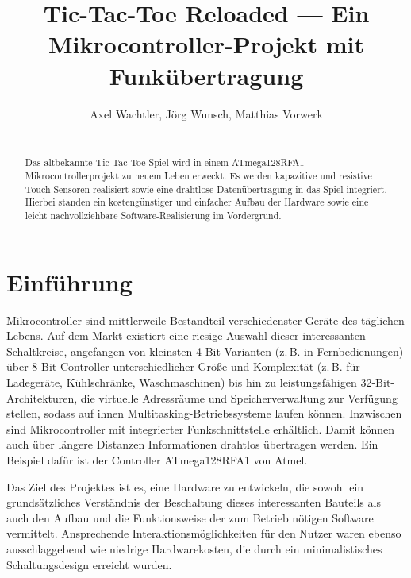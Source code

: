 \documentclass{clt2012}
\begin{document}
\title{Tic-\hspace{-0.2em}Tac-\hspace{-0.2em}Toe Reloaded --- Ein Mikrocontroller-Projekt mit Funkübertragung}
\author{Axel Wachtler, Jörg Wunsch, Matthias Vorwerk\\
\\
}
\maketitle

\begin{abstract}
Das altbekannte Tic-Tac-Toe-Spiel wird in einem \mbox{ATmega128RFA1}-Mikro\-con\-trol\-ler\-pro\-jekt zu neuem Leben erweckt.
Es werden kapazitive und resistive Touch-Sensoren realisiert sowie eine drahtlose Datenübertragung in das Spiel integriert.
Hierbei standen ein kostengünstiger und einfacher Aufbau der Hardware sowie eine leicht nachvollziehbare Software-Realisierung im Vordergrund.
\end{abstract}

\setlength{\parskip}{1ex}

\section{Einführung}
Mikrocontroller sind mittlerweile Bestandteil verschiedenster Geräte des täglichen Lebens. Auf dem Markt existiert eine riesige Auswahl dieser interessanten Schaltkreise, angefangen von kleinsten 4-Bit-Varianten (z.\,B. in Fernbedienungen) über 8-Bit-Controller unterschiedlicher Größe und Komplexität (z.\,B. für Ladegeräte, Kühlschränke, Waschmaschinen) bis hin zu leistungsfähigen 32-Bit-Architekturen, die virtuelle Adressräume und Speicherverwaltung zur Verfügung stellen, sodass auf ihnen Mul\-ti\-task\-ing-Betriebssysteme laufen können.
Inzwischen sind Mikrocontroller mit integrierter Funkschnittstelle erhältlich. Damit können auch über längere Distanzen Informationen drahtlos übertragen werden. Ein Beispiel dafür ist der Controller \mbox{ATmega128RFA1} von Atmel. 

Das Ziel des Projektes ist es, eine Hardware zu entwickeln, die sowohl ein grundsätzliches
Verständnis der Beschaltung dieses interessanten Bauteils als auch den Aufbau und die
Funktionsweise der zum Betrieb nötigen Software vermittelt. Ansprechende 
Interaktionsmöglichkeiten für den Nutzer waren ebenso ausschlaggebend wie niedrige Hardwarekosten, die
durch ein minimalistisches Schaltungsdesign erreicht wurden.
\end{document}
